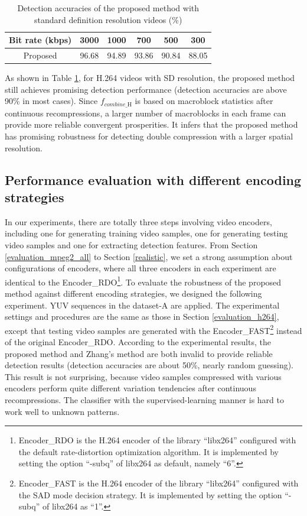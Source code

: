 \documentclass[journal,sort]{IEEEtran}
\begin{document}
\begin{table}[htbp]
	\centering
	\caption{Detection accuracies of the proposed method with standard definition resolution videos (\%)}
	\begin{tabular}{cccccc}
		\toprule
		Bit rate (kbps) & 3000  & 1000  & 700   & 500   & 300 \\
		\midrule
		Proposed  & 96.68 & 94.89 & 93.86 & 90.84 & 88.05 \\
		\bottomrule
	\end{tabular}%
	\label{tab:SD}%
\end{table}%

As shown in Table \ref{tab:SD}, for H.264 videos with SD resolution, the proposed method still achieves promising detection performance (detection accuracies are above 90\% in most cases). Since $f_{combine\_\text{H}}$ is based on macroblock statistics after continuous recompressions, a larger number of macroblocks in each frame can provide more reliable convergent prosperities. It infers that the proposed method has promising robustness for detecting double compression with a larger spatial resolution.


\subsection{Performance evaluation with different encoding strategies\label{diff_strategy}}
In our experiments, there are totally three steps involving video encoders, including one for generating training video samples, one for generating testing video samples and one for extracting detection features. From Section \ref{evaluation_mpeg2_all} to Section \ref{realistic}, we set a strong assumption about configurations of encoders, where all three encoders in each experiment are identical to the Encoder\_RDO\footnote{Encoder\_RDO is the H.264 encoder of the library ``libx264'' configured with the default rate-distortion optimization algorithm. It is implemented by setting the option ``-subq'' of libx264 as default, namely ``6''.}. To evaluate the robustness of the proposed method against different encoding strategies, we designed the following experiment. YUV sequences in the dataset-A are applied. The experimental settings and procedures are the same as those in Section \ref{evaluation_h264}, except that testing video samples are generated with the Encoder\_FAST\footnote{Encoder\_FAST is the H.264 encoder of the library ``libx264'' configured with the SAD mode decision strategy. It is implemented by setting the option ``-subq'' of libx264 as ``1''.} instead of the original Encoder\_RDO. According to the experimental results, the proposed method and Zhang's method are both invalid to provide reliable detection results (detection accuracies are about 50\%, nearly random guessing). This result is not surprising, because video samples compressed with various encoders perform quite different variation tendencies after continuous recompressions. The classifier with the supervised-learning manner is hard to work well to unknown patterns.
\end{document}
